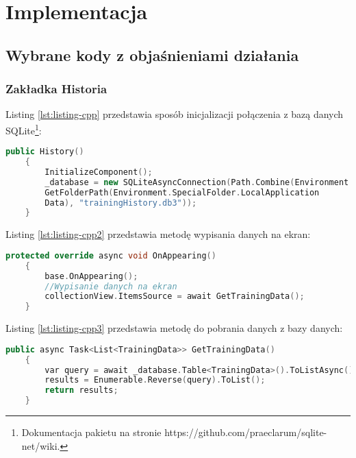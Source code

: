 	\newpage
\section{Implementacja}		%

\subsection{Wybrane kody z objaśnieniami działania}		%

\subsubsection{Zakładka Historia} %

\hspace{0.60cm}Listing \ref{lst:listing-cpp} przedstawia sposób inicjalizacji połączenia z bazą danych SQLite\footnote{Dokumentacja pakietu na stronie   https://github.com/praeclarum/sqlite-net/wiki\cite{www4}.}:
\begin{lstlisting}[caption=Połączenie z bazą danych, label={lst:listing-cpp}, language=C++]
	public History()
	{
		InitializeComponent();		
		_database = new SQLiteAsyncConnection(Path.Combine(Environment.
		GetFolderPath(Environment.SpecialFolder.LocalApplication
		Data), "trainingHistory.db3"));
	}
\end{lstlisting}

Listing \ref{lst:listing-cpp2} przedstawia metodę wypisania danych na ekran:
\begin{lstlisting}[caption=Wypisanie danych na ekran, label={lst:listing-cpp2}, language=C++]
	protected override async void OnAppearing()
	{
		base.OnAppearing();		
		//Wypisanie danych na ekran
		collectionView.ItemsSource = await GetTrainingData();
	}
\end{lstlisting}

Listing \ref{lst:listing-cpp3} przedstawia metodę do pobrania danych z bazy danych:
\begin{lstlisting}[caption=Pobranie danych z bazy, label={lst:listing-cpp3}, language=C++]
	public async Task<List<TrainingData>> GetTrainingData()
	{
		var query = await _database.Table<TrainingData>().ToListAsync();
		results = Enumerable.Reverse(query).ToList();
		return results;
	}
\end{lstlisting}

